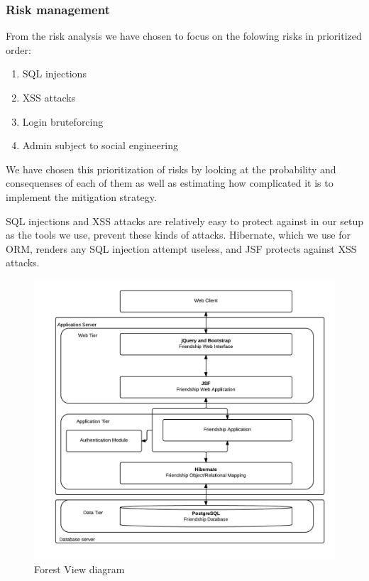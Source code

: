 \documentclass[a4paper]{article}
\begin{document}
\subsubsection{Risk management}
From the risk analysis we have chosen to focus on the folowing risks in prioritized order:
\begin{enumerate}
\item{SQL injections}
\item{XSS attacks}
\item{Login bruteforcing}
\item{Admin subject to social engineering}
\end{enumerate}

We have chosen this prioritization of risks by looking at the probability and consequenses of each of them as well as estimating how complicated it is to implement the mitigation strategy.

SQL injections and XSS attacks are relatively easy to protect against in our setup as the tools we use, prevent these kinds of attacks. Hibernate, which we use for ORM, renders any SQL injection attempt useless, and JSF protects against XSS attacks.

\begin{figure}[h!]
\centering
\includegraphics[scale=0.3]{ForestView}
\caption{Forest View diagram}
\label{fig:forest_view}
\end{figure}
\end{document}

